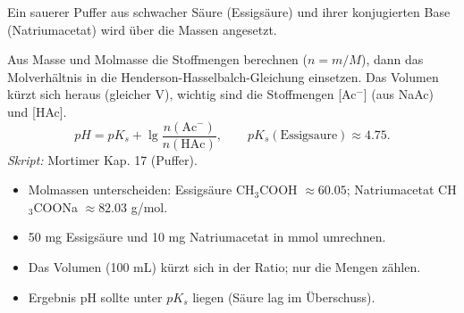 

Ein sauerer Puffer aus schwacher Säure (Essigsäure) und ihrer konjugierten
Base (Natriumacetat) wird über die Massen angesetzt.

\begin{werkzeugkasten}
Aus Masse und Molmasse die Stoffmengen berechnen ($n=m/M$), dann das
Molverhältnis in die Henderson-Hasselbalch-Gleichung einsetzen. Das
Volumen kürzt sich heraus (gleicher V), wichtig sind die Stoffmengen
[Ac$^-$] (aus NaAc) und [HAc].
\[
  pH = pK_s + \lg\frac{n(\mathrm{Ac^-})}{n(\mathrm{HAc})},
  \qquad pK_s(\mathrm{Essigs\text{a}ure})\approx4.75 .
\]
\textit{Skript:} Mortimer Kap. 17 (Puffer).
\end{werkzeugkasten}

\begin{achtung}
\begin{itemize}
  \item Molmassen unterscheiden: Essigsäure CH$_3$COOH $\approx60.05$;
        Natriumacetat CH$_3$COONa $\approx82.03$ g/mol.
  \item 50 mg Essigsäure und 10 mg Natriumacetat in mmol umrechnen.
  \item Das Volumen (100 mL) kürzt sich in der Ratio; nur die Mengen zählen.
  \item Ergebnis pH sollte unter $pK_s$ liegen (Säure lag im Überschuss).
\end{itemize}
\end{achtung}
